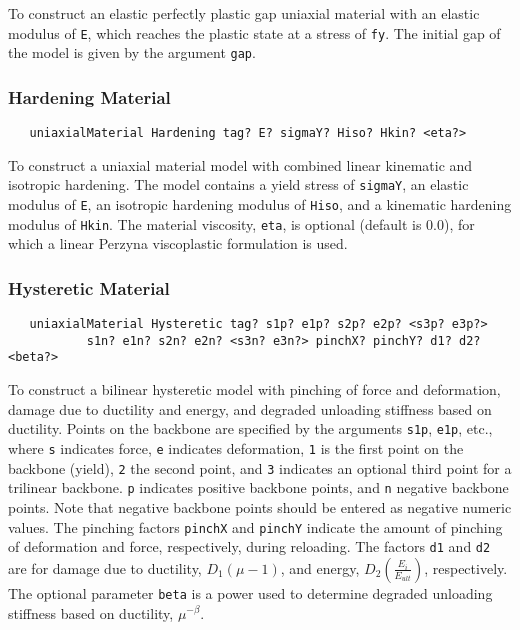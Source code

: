 \documentclass[12pt]{article}
\begin{document}
\noindent To construct an elastic perfectly plastic gap uniaxial material
with an elastic modulus of {\tt E}, which reaches the plastic state at a
stress of {\tt fy}. The initial gap of the model is given by the argument
{\tt gap}.

\subsubsection{Hardening Material}
{\sf\small
\begin{verbatim}
   uniaxialMaterial Hardening tag? E? sigmaY? Hiso? Hkin? <eta?>
\end{verbatim}
}

\noindent To construct a uniaxial material model with combined linear kinematic
and isotropic hardening. The model contains a yield stress of {\tt sigmaY}, an
elastic modulus of {\tt E}, an isotropic hardening modulus of {\tt Hiso},
and a kinematic hardening modulus of {\tt Hkin}. The material viscosity,
{\tt eta}, is optional (default is 0.0), for which a linear Perzyna
viscoplastic formulation is used.

\subsubsection{Hysteretic Material}
{\sf\small
\begin{verbatim}
   uniaxialMaterial Hysteretic tag? s1p? e1p? s2p? e2p? <s3p? e3p?>
           s1n? e1n? s2n? e2n? <s3n? e3n?> pinchX? pinchY? d1? d2? <beta?>
\end{verbatim}
}

\noindent To construct a bilinear hysteretic model with pinching of force and
deformation, damage due to ductility and energy, and degraded unloading 
stiffness based on ductility. Points on the backbone are specified by the
arguments {\tt s1p}, {\tt e1p}, etc.,
where {\tt s} indicates force, {\tt e} indicates deformation,
{\tt 1} is the first point on the backbone (yield), {\tt 2} the second
point, and {\tt 3} indicates
an optional third point for a trilinear backbone. {\tt p} indicates
positive backbone
points, and {\tt n} negative backbone points.
Note that negative backbone points should be entered as negative numeric
values. The pinching factors {\tt pinchX} and
{\tt pinchY} indicate the amount of pinching of deformation and force,
respectively, during reloading. The factors {\tt d1} and {\tt d2}
are for damage due to ductility, $D_1(\mu-1)$, and energy,
$D_2(\frac{E_i}{E_{ult}})$, respectively. 
The optional parameter {\tt beta} is a power used to determine degraded
unloading stiffness based on ductility, $\mu^{-\beta}$.
\end{document}
